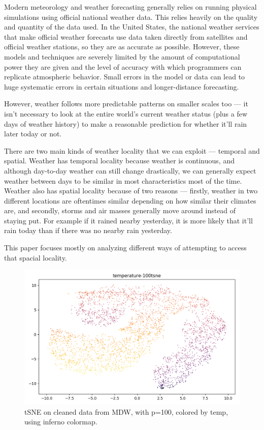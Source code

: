 \documentclass[a4paper]{article}
\begin{document}
Modern meteorology and weather forecasting generally relies on running physical simulations using official national weather data. This relies heavily on the quality and quantity of the data used. In the United States, the national weather services that make official weather forecasts use data taken directly from satellites and official weather stations, so they are as accurate as possible. However, these models and techniques are severely limited by the amount of computational power they are given and the level of accuracy with which programmers can replicate atmospheric behavior. Small errors in the model or data can lead to huge systematic errors in certain situations and longer-distance forecasting.

However, weather follows more predictable patterns on smaller scales too --- it isn't necessary to look at the entire world's current weather status (plus a few days of weather history) to make a reasonable prediction for whether it'll rain later today or not. 

There are two main kinds of weather locality that we can exploit --- temporal and spatial. Weather has temporal locality because weather is continuous, and although day-to-day weather can still change drastically, we can generally expect weather between days to be similar in most characteristics most of the time. Weather also has spatial locality because of two reasons --- firstly, weather in two different locations are oftentimes similar depending on how similar their climates are, and secondly, storms and air masses generally move around instead of staying put. For example if it rained nearby yesterday, it is more likely that it'll rain today than if there was no nearby rain yesterday. 

This paper focuses mostly on analyzing different ways of attempting to access that spacial locality.

\begin{figure}[t]
  \centering
  \includegraphics[width=\linewidth]{../png/vis/temperature-100tsne.png}
  \caption{tSNE on cleaned data from MDW, with p=100, colored by temp, using inferno colormap.}
  \label{fig:15tsne_temp}
\end{figure}
\end{document}
